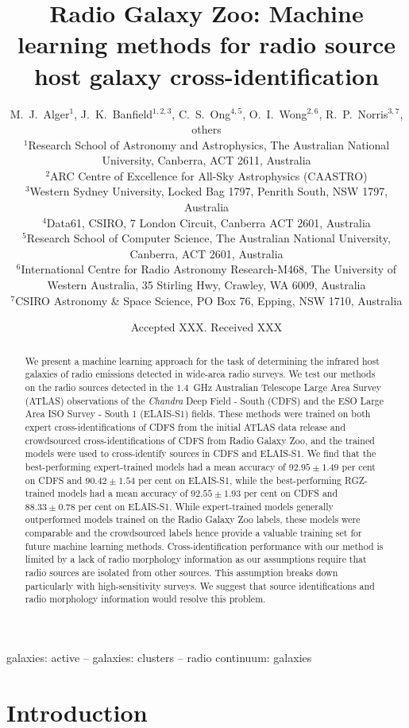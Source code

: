 \documentclass[fleqn,usenatbib,usedcolumn]{mnras}
\title[Machine learning methods for radio source cross-identification]{Radio Galaxy Zoo: Machine learning methods for radio source host galaxy cross-identification}
\author[Alger et al.]{M.~J.~Alger$^{1}$, J.~K.~Banfield$^{1, 2, 3}$, C.~S.~Ong$^{4, 5}$, O.~I.~Wong$^{2, 6}$, R.~P.~Norris$^{3, 7}$, others
\\
$^{1}$Research School of Astronomy and Astrophysics, The Australian National University, Canberra, ACT 2611, Australia\\
$^{2}$ARC Centre of Excellence for All-Sky Astrophysics (CAASTRO)\\
$^{3}$Western Sydney University, Locked Bag 1797, Penrith South, NSW 1797, Australia\\
$^{4}$Data61, CSIRO, 7 London Circuit, Canberra ACT 2601, Australia\\
$^{5}$Research School of Computer Science, The Australian National University, Canberra, ACT 2601, Australia\\
$^{6}$International Centre for Radio Astronomy Research-M468, The University of Western Australia, 35 Stirling Hwy, Crawley, WA 6009, Australia\\
$^{7}$CSIRO Astronomy \& Space Science, PO Box 76, Epping, NSW 1710, Australia
}
\date{Accepted XXX. Received XXX}
\begin{document}
\label{firstpage}
\pagerange{\pageref{firstpage}--\pageref{lastpage}}
\maketitle

\begin{abstract}
  We present a machine learning approach for the task of determining the
  infrared host galaxies of radio emissions detected in wide-area radio
  surveys. We test our methods on the radio sources detected in the $1.4$~GHz
  Australian Telescope Large Area Survey (ATLAS) observations of the
  \emph{Chandra} Deep Field - South (CDFS) and the ESO Large Area ISO Survey -
  South 1 (ELAIS-S1) fields. These methods were trained on both expert
  cross-identifications of CDFS from the initial ATLAS data release and
  crowdsourced cross-identifications of CDFS from Radio Galaxy Zoo, and the
  trained models were used to cross-identify sources in CDFS and ELAIS-S1. We
  find that the best-performing expert-trained models had a mean accuracy of
  $92.95 \pm 1.49$ per cent on CDFS and $90.42 \pm 1.54$ per cent on ELAIS-S1,
  while the best-performing RGZ-trained models had a mean accuracy of $92.55
  \pm 1.93$ per cent on CDFS and $88.33 \pm 0.78$ per cent on ELAIS-S1. While
  expert-trained models generally outperformed models trained on the Radio
  Galaxy Zoo labels, these models were comparable and the crowdsourced labels
  hence provide a valuable training set for future machine learning methods.
  Cross-identification performance with our method is limited by a lack of
  radio morphology information as our assumptions require that radio sources
  are isolated from other sources. This assumption breaks down particularly
  with high-sensitivity surveys. We suggest that source identifications and
  radio morphology information would resolve this problem.
\end{abstract}

\begin{keywords}
galaxies: active -- galaxies: clusters -- radio continuum: galaxies
\end{keywords}


\section{Introduction}\label{introduction}
\end{document}
